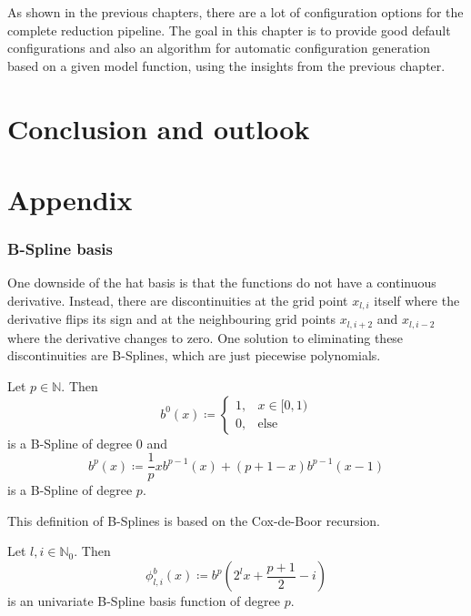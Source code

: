\documentclass[
  a4paper,  %
  twoside,  %
  bibliography=totoc,
  headsepline,
  cleardoublepage=empty,
  parskip=half,
  draft=false
]{scrbook}
\begin{document}
As shown in the previous chapters, there are a lot of configuration options for the complete reduction pipeline.
The goal in this chapter is to provide good default configurations and also an algorithm for automatic configuration generation based on a given model function, using the insights from the previous chapter.

\chapter{Conclusion and outlook}



\appendix
\chapter{Appendix}

\subsection{B-Spline basis}

One downside of the hat basis is that the functions do not have a continuous derivative.
Instead, there are discontinuities at the grid point $x_{l,i}$ itself where the derivative flips its sign and at the neighbouring grid points $x_{l,i+2}$ and $x_{l,i-2}$ where the derivative changes to zero.
One solution to eliminating these discontinuities are B-Splines, which are just piecewise polynomials.
\begin{definition}[B-Splines]
Let $p \in \mathds{N}$.
Then
\begin{equation}
b^0(x) \coloneqq
\begin{cases}
    1, & x \in [0,1) \\
   0, & \text{else}
\end{cases}
\end{equation}
is a B-Spline of degree $0$ and
\begin{equation}
b^p(x) \coloneqq \frac{1}{p} xb^{p-1}(x) + (p + 1 - x) b^{p-1}(x-1) 
\end{equation}
is a B-Spline of degree $p$.
\end{definition}
This definition of B-Splines is based on the Cox-de-Boor recursion.

\begin{definition}
Let $l,i \in \mathds{N}_0$.
Then
\begin{equation}
\phi^b_{l,i}(x) \coloneqq b^p \left( 2^l x + \frac{p+1}{2} -i \right)
\end{equation}
is an univariate B-Spline basis function of degree $p$.
\end{definition}
\end{document}
